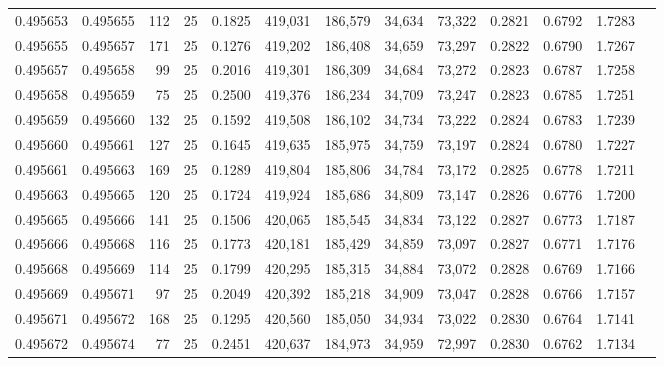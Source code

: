 \begin{tabular}{rrrrrrrrrrrrr}
0.495653 & 0.495655 &   112 &  25 &                                     0.1825 & 419,031 & 186,579 &  34,634 &  73,322 & 0.2821 & 0.6792 & 1.7283 \\
0.495655 & 0.495657 &   171 &  25 &                                     0.1276 & 419,202 & 186,408 &  34,659 &  73,297 & 0.2822 & 0.6790 & 1.7267 \\
0.495657 & 0.495658 &    99 &  25 &                                     0.2016 & 419,301 & 186,309 &  34,684 &  73,272 & 0.2823 & 0.6787 & 1.7258 \\
0.495658 & 0.495659 &    75 &  25 &                                     0.2500 & 419,376 & 186,234 &  34,709 &  73,247 & 0.2823 & 0.6785 & 1.7251 \\
0.495659 & 0.495660 &   132 &  25 &                                     0.1592 & 419,508 & 186,102 &  34,734 &  73,222 & 0.2824 & 0.6783 & 1.7239 \\
0.495660 & 0.495661 &   127 &  25 &                                     0.1645 & 419,635 & 185,975 &  34,759 &  73,197 & 0.2824 & 0.6780 & 1.7227 \\
0.495661 & 0.495663 &   169 &  25 &                                     0.1289 & 419,804 & 185,806 &  34,784 &  73,172 & 0.2825 & 0.6778 & 1.7211 \\
0.495663 & 0.495665 &   120 &  25 &                                     0.1724 & 419,924 & 185,686 &  34,809 &  73,147 & 0.2826 & 0.6776 & 1.7200 \\
0.495665 & 0.495666 &   141 &  25 &                                     0.1506 & 420,065 & 185,545 &  34,834 &  73,122 & 0.2827 & 0.6773 & 1.7187 \\
0.495666 & 0.495668 &   116 &  25 &                                     0.1773 & 420,181 & 185,429 &  34,859 &  73,097 & 0.2827 & 0.6771 & 1.7176 \\
0.495668 & 0.495669 &   114 &  25 &                                     0.1799 & 420,295 & 185,315 &  34,884 &  73,072 & 0.2828 & 0.6769 & 1.7166 \\
0.495669 & 0.495671 &    97 &  25 &                                     0.2049 & 420,392 & 185,218 &  34,909 &  73,047 & 0.2828 & 0.6766 & 1.7157 \\
0.495671 & 0.495672 &   168 &  25 &                                     0.1295 & 420,560 & 185,050 &  34,934 &  73,022 & 0.2830 & 0.6764 & 1.7141 \\
0.495672 & 0.495674 &    77 &  25 &                                     0.2451 & 420,637 & 184,973 &  34,959 &  72,997 & 0.2830 & 0.6762 & 1.7134 \\

\end{tabular}
